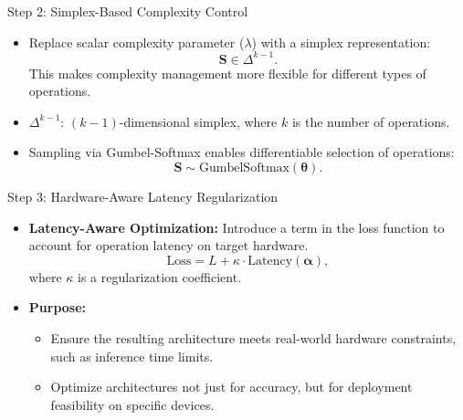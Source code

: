 \documentclass{beamer}
\begin{document}

\begin{frame}{Step 2: Simplex-Based Complexity Control}
\begin{itemize}
    \item Replace scalar complexity parameter (\(\lambda\)) with a simplex representation:
    \[
    \boldsymbol{S} \in \Delta^{k-1}.
    \]
    This makes complexity management more flexible for different types of operations.  
    \item \(\Delta^{k-1}\): \((k-1)\)-dimensional simplex, where \(k\) is the number of operations.
    \item Sampling via Gumbel-Softmax enables differentiable selection of operations:
    \[
    \boldsymbol{S} \sim \text{GumbelSoftmax}(\boldsymbol{\theta}).
    \]
\end{itemize}
\end{frame}


\begin{frame}{Step 3: Hardware-Aware Latency Regularization}
\begin{itemize}
    \item \textbf{Latency-Aware Optimization:}  
    Introduce a term in the loss function to account for operation latency on target hardware.
    \[
    \text{Loss} = L + \kappa \cdot \text{Latency}(\boldsymbol{\alpha}),
    \]
    where \(\kappa\) is a regularization coefficient.
    \item \textbf{Purpose:}  
    \begin{itemize}
        \item Ensure the resulting architecture meets real-world hardware constraints, such as inference time limits.
        \item Optimize architectures not just for accuracy, but for deployment feasibility on specific devices.
    \end{itemize}
\end{itemize}
\end{frame}


\end{document}

